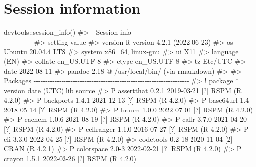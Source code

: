 \documentclass[
  11pt,
  letterpaper,
  DIV=11,
  numbers=noendperiod]{scrartcl}
\newenvironment{Shaded}{}{}
\newcommand{\CommentTok}[1]{\textcolor[rgb]{0.42,0.45,0.49}{#1}}
\newcommand{\FunctionTok}[1]{\textcolor[rgb]{0.44,0.26,0.76}{#1}}
\newcommand{\NormalTok}[1]{\textcolor[rgb]{0.14,0.16,0.18}{#1}}
\newcommand{\SpecialCharTok}[1]{\textcolor[rgb]{0.00,0.36,0.77}{#1}}
\begin{document}
\hypertarget{session-information}{%
\section{Session information}\label{session-information}}

\begin{Shaded}
\begin{Highlighting}[]
\NormalTok{devtools}\SpecialCharTok{::}\FunctionTok{session\_info}\NormalTok{()}
\CommentTok{\#\textgreater{} {-} Session info {-}{-}{-}{-}{-}{-}{-}{-}{-}{-}{-}{-}{-}{-}{-}{-}{-}{-}{-}{-}{-}{-}{-}{-}{-}{-}{-}{-}{-}{-}{-}{-}{-}{-}{-}{-}{-}{-}{-}{-}{-}{-}{-}{-}{-}{-}{-}{-}{-}{-}{-}{-}{-}{-}{-}{-}{-}{-}{-}{-}{-}{-}{-}}
\CommentTok{\#\textgreater{}  setting  value}
\CommentTok{\#\textgreater{}  version  R version 4.2.1 (2022{-}06{-}23)}
\CommentTok{\#\textgreater{}  os       Ubuntu 20.04.4 LTS}
\CommentTok{\#\textgreater{}  system   x86\_64, linux{-}gnu}
\CommentTok{\#\textgreater{}  ui       X11}
\CommentTok{\#\textgreater{}  language (EN)}
\CommentTok{\#\textgreater{}  collate  en\_US.UTF{-}8}
\CommentTok{\#\textgreater{}  ctype    en\_US.UTF{-}8}
\CommentTok{\#\textgreater{}  tz       Etc/UTC}
\CommentTok{\#\textgreater{}  date     2022{-}08{-}11}
\CommentTok{\#\textgreater{}  pandoc   2.18 @ /usr/local/bin/ (via rmarkdown)}
\CommentTok{\#\textgreater{} }
\CommentTok{\#\textgreater{} {-} Packages {-}{-}{-}{-}{-}{-}{-}{-}{-}{-}{-}{-}{-}{-}{-}{-}{-}{-}{-}{-}{-}{-}{-}{-}{-}{-}{-}{-}{-}{-}{-}{-}{-}{-}{-}{-}{-}{-}{-}{-}{-}{-}{-}{-}{-}{-}{-}{-}{-}{-}{-}{-}{-}{-}{-}{-}{-}{-}{-}{-}{-}{-}{-}{-}{-}{-}{-}}
\CommentTok{\#\textgreater{}  ! package     * version date (UTC) lib source}
\CommentTok{\#\textgreater{}  P assertthat    0.2.1   2019{-}03{-}21 [?] RSPM (R 4.2.0)}
\CommentTok{\#\textgreater{}  P backports     1.4.1   2021{-}12{-}13 [?] RSPM (R 4.2.0)}
\CommentTok{\#\textgreater{}  P base64url     1.4     2018{-}05{-}14 [?] RSPM (R 4.2.0)}
\CommentTok{\#\textgreater{}  P broom         1.0.0   2022{-}07{-}01 [?] RSPM (R 4.2.0)}
\CommentTok{\#\textgreater{}  P cachem        1.0.6   2021{-}08{-}19 [?] RSPM (R 4.2.0)}
\CommentTok{\#\textgreater{}  P callr         3.7.0   2021{-}04{-}20 [?] RSPM (R 4.2.0)}
\CommentTok{\#\textgreater{}  P cellranger    1.1.0   2016{-}07{-}27 [?] RSPM (R 4.2.0)}
\CommentTok{\#\textgreater{}  P cli           3.3.0   2022{-}04{-}25 [?] RSPM (R 4.2.0)}
\CommentTok{\#\textgreater{}    codetools     0.2{-}18  2020{-}11{-}04 [2] CRAN (R 4.2.1)}
\CommentTok{\#\textgreater{}  P colorspace    2.0{-}3   2022{-}02{-}21 [?] RSPM (R 4.2.0)}
\CommentTok{\#\textgreater{}  P crayon        1.5.1   2022{-}03{-}26 [?] RSPM (R 4.2.0)}

\end{Highlighting}
\end{Shaded}
\end{document}

